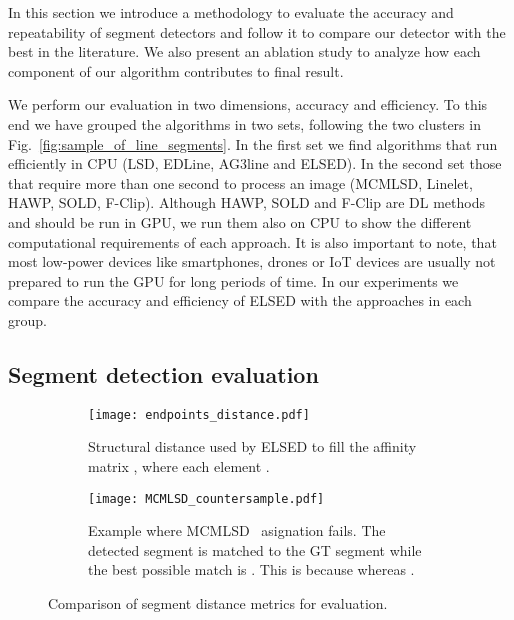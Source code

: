 \documentclass[preprint,12pt]{elsarticle}
\begin{document}
In this section we introduce a methodology to evaluate the accuracy and repeatability of segment detectors and  follow it to compare our detector with the best in the literature. We also 
present an ablation study to analyze how each component of our algorithm contributes to final result.

We perform our evaluation in two dimensions, accuracy and efficiency. To this end we have grouped the algorithms in two sets, following the two clusters in Fig.~\ref{fig:sample_of_line_segments}. In the first set we find algorithms that run efficiently in CPU (LSD, EDLine, AG3line and ELSED). In the second set those that require more than one second to process an image (MCMLSD, Linelet, HAWP, SOLD, F-Clip). 
Although HAWP, SOLD and F-Clip are DL methods and should be run in GPU, we run them also on CPU to show the different computational requirements of each approach. It is also important to note, that most low-power devices like smartphones, drones or IoT devices are usually not prepared to run the GPU for long periods of time.
In our experiments we compare the accuracy and efficiency of ELSED with the approaches in each group.





\subsection{Segment detection evaluation}
\label{sec:exp-seg-detection}


\begin{figure}
  \centering \medskip
  \begin{subfigure}[t]{1.0\linewidth}
    \centering\texttt{[image: endpoints\_distance.pdf]}
  \caption{Structural distance used by ELSED to fill the affinity matrix , where each element .}
    \label{fig:Structural-distance}    
  \end{subfigure}
\begin{subfigure}[t]{1.0\linewidth}
    \centering\texttt{[image: MCMLSD\_countersample.pdf]}
  \caption{Example where MCMLSD~\cite{almazan2017mcmlsd} asignation fails. The detected segment  is matched to the GT segment  while the best possible match is . This is because  whereas .}
  \label{fig:MCMLSD-countersampple}
  \end{subfigure}
  \label{fig:segments-distance-comparison}
  \caption{Comparison of segment distance metrics for evaluation.}
\end{figure}
\end{document}
